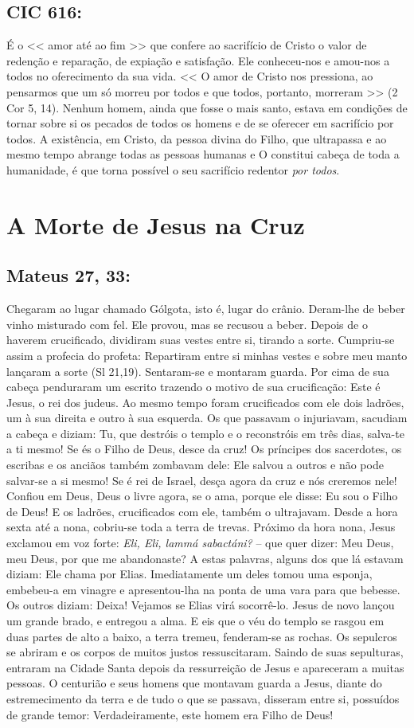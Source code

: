 \documentclass[10pt,a5paper]{book}
\newcommand{\from}[1]{\subsection*{#1}}
\begin{document}
\from{CIC 616:}

É o << amor até ao fim >> que confere ao sacrifício de Cristo o valor de redenção e reparação, de expiação e satisfação.
Ele conheceu-nos e amou-nos a todos no oferecimento da sua vida.
<< O amor de Cristo nos pressiona, ao pensarmos que um só morreu por todos e que todos, portanto, morreram >> (2 Cor 5, 14).
Nenhum homem, ainda que fosse o mais santo, estava em condições de tornar sobre si os pecados de todos os homens e de se oferecer em sacrifício por todos.
A existência, em Cristo, da pessoa divina do Filho, que ultrapassa e ao mesmo tempo abrange todas as pessoas humanas e O constitui cabeça de toda a humanidade, é que torna possível o seu sacrifício redentor \emph{por todos}.


\section{A Morte de Jesus na Cruz}

\from{Mateus 27, 33:}

Chegaram ao lugar chamado Gólgota, isto é, lugar do crânio.
Deram-lhe de beber vinho misturado com fel. Ele provou, mas se recusou a beber.
Depois de o haverem crucificado, dividiram suas vestes entre si, tirando a sorte. Cumpriu-se assim a profecia do profeta: Repartiram entre si minhas vestes e sobre meu manto lançaram a sorte (Sl 21,19).
Sentaram-se e montaram guarda.
Por cima de sua cabeça penduraram um escrito trazendo o motivo de sua crucificação:
Este é Jesus, o rei dos judeus.
Ao mesmo tempo foram crucificados com ele dois ladrões, um à sua direita e outro à sua esquerda.
Os que passavam o injuriavam, sacudiam a cabeça e diziam:
Tu, que destróis o templo e o reconstróis em três dias, salva-te a ti mesmo!
Se és o Filho de Deus, desce da cruz!
Os príncipes dos sacerdotes, os escribas e os anciãos também zombavam dele:
Ele salvou a outros e não pode salvar-se a si mesmo!
Se é rei de Israel, desça agora da cruz e nós creremos nele!
Confiou em Deus, Deus o livre agora, se o ama, porque ele disse: Eu sou o Filho de Deus!
E os ladrões, crucificados com ele, também o ultrajavam.
Desde a hora sexta até a nona, cobriu-se toda a terra de trevas.
Próximo da hora nona, Jesus exclamou em voz forte:
\emph{Eli, Eli, lammá sabactáni?} -- que quer dizer: Meu Deus, meu Deus, por que me abandonaste?
A estas palavras, alguns dos que lá estavam diziam: Ele chama por Elias.
Imediatamente um deles tomou uma esponja, embebeu-a em vinagre e apresentou-lha na ponta de uma vara para que bebesse.
Os outros diziam: Deixa! Vejamos se Elias virá socorrê-lo.
Jesus de novo lançou um grande brado, e entregou a alma.
E eis que o véu do templo se rasgou em duas partes de alto a baixo, a terra tremeu, fenderam-se as rochas.
Os sepulcros se abriram e os corpos de muitos justos ressuscitaram.
Saindo de suas sepulturas, entraram na Cidade Santa depois da ressurreição de Jesus e apareceram a muitas pessoas.
O centurião e seus homens que montavam guarda a Jesus, diante do estremecimento da terra e de tudo o que se passava, disseram entre si, possuídos de grande temor:
Verdadeiramente, este homem era Filho de Deus!
\end{document}
